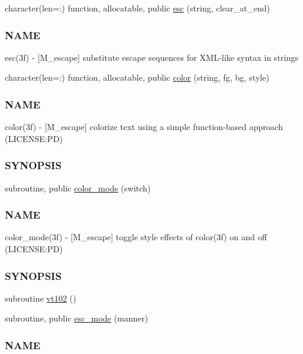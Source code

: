 \begin{DoxyCompactItemize}
\item 
character(len=\+:) function, allocatable, public \mbox{\hyperlink{namespacem__escape_a36f016baad6b23f86189e6f3ee6db0cb}{esc}} (string, clear\+\_\+at\+\_\+end)
\begin{DoxyCompactList}\small\item\em \subsubsection*{N\+A\+ME}

esc(3f) -\/ \mbox{[}M\+\_\+escape\mbox{]} substitute escape sequences for X\+M\+L-\/like syntax in strings \end{DoxyCompactList}\item 
character(len=\+:) function, allocatable, public \mbox{\hyperlink{namespacem__escape_af7d28a73e65efb58beeb684d7bdeefec}{color}} (string, fg, bg, style)
\begin{DoxyCompactList}\small\item\em \subsubsection*{N\+A\+ME}

color(3f) -\/ \mbox{[}M\+\_\+escape\mbox{]} colorize text using a simple function-\/based approach (L\+I\+C\+E\+N\+SE\+:PD) \subsubsection*{S\+Y\+N\+O\+P\+S\+IS}\end{DoxyCompactList}\item 
subroutine, public \mbox{\hyperlink{namespacem__escape_a24566737cb6aa1672180eaa21c8d4f66}{color\+\_\+mode}} (switch)
\begin{DoxyCompactList}\small\item\em \subsubsection*{N\+A\+ME}

color\+\_\+mode(3f) -\/ \mbox{[}M\+\_\+escape\mbox{]} toggle style effects of color(3f) on and off (L\+I\+C\+E\+N\+SE\+:PD) \subsubsection*{S\+Y\+N\+O\+P\+S\+IS}\end{DoxyCompactList}\item 
subroutine \mbox{\hyperlink{namespacem__escape_ae9d40717b2e75e90e2505d5fed6435c5}{vt102}} ()
\item 
subroutine, public \mbox{\hyperlink{namespacem__escape_a4210456d81d9a1bf328093a9635e640b}{esc\+\_\+mode}} (manner)
\begin{DoxyCompactList}\small\item\em \subsubsection*{N\+A\+ME}


\end{DoxyCompactList}
\end{DoxyCompactItemize}
